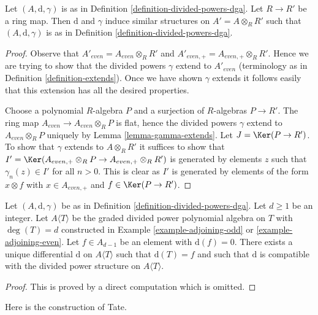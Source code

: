\begin{lemma}
\label{lemma-base-change-div}
Let $(A, \text{d}, \gamma)$ is as in
Definition \ref{definition-divided-powers-dga}.
Let $R \to R'$ be a ring map.
Then $\text{d}$ and $\gamma$ induce similar structures on
$A' = A \otimes_R R'$ such that $(A, \text{d}, \gamma)$ is as in
Definition \ref{definition-divided-powers-dga}.
\end{lemma}

\begin{proof}
Observe that $A'_{even} = A_{even} \otimes_R R'$ and
$A'_{even, +} = A_{even, +} \otimes_R R'$. Hence we are trying to
show that the divided powers $\gamma$ extend to $A'_{even}$
(terminology as in Definition \ref{definition-extends}).
Once we have shown $\gamma$ extends it follows easily that this
extension has all the desired properties.

\medskip\noindent
Choose a polynomial $R$-algebra $P$ and a surjection of $R$-algebras
$P \to R'$. The ring map $A_{even} \to A_{even} \otimes_R P$ is flat,
hence the divided powers $\gamma$ extend to $A_{even} \otimes_R P$
uniquely by Lemma \ref{lemma-gamma-extends}.
Let $J = \Ker(P \to R')$. To show that $\gamma$ extends
to $A \otimes_R R'$ it suffices to show that
$I' = \Ker(A_{even, +} \otimes_R P \to A_{even, +} \otimes_R R')$
is generated by elements $z$ such that $\gamma_n(z) \in I'$
for all $n > 0$. This is clear as $I'$ is generated by elements
of the form $x \otimes f$ with
$x \in A_{even, +}$ and $f \in \Ker(P \to R')$.
\end{proof}

\begin{lemma}
\label{lemma-extend-differential}
Let $(A, \text{d}, \gamma)$ be as in
Definition \ref{definition-divided-powers-dga}.
Let $d \geq 1$ be an integer.
Let $A\langle T \rangle$ be the graded divided power polynomial algebra
on $T$ with $\deg(T) = d$
constructed in Example \ref{example-adjoining-odd} or
\ref{example-adjoining-even}.
Let $f \in A_{d - 1}$ be an element with $\text{d}(f) = 0$.
There exists a unique differential $\text{d}$
on $A\langle T\rangle$ such that $\text{d}(T) = f$ and
such that $\text{d}$ is compatible with the divided power
structure on $A\langle T \rangle$.
\end{lemma}

\begin{proof}
This is proved by a direct computation which is omitted.
\end{proof}

\noindent
Here is the construction of Tate.

